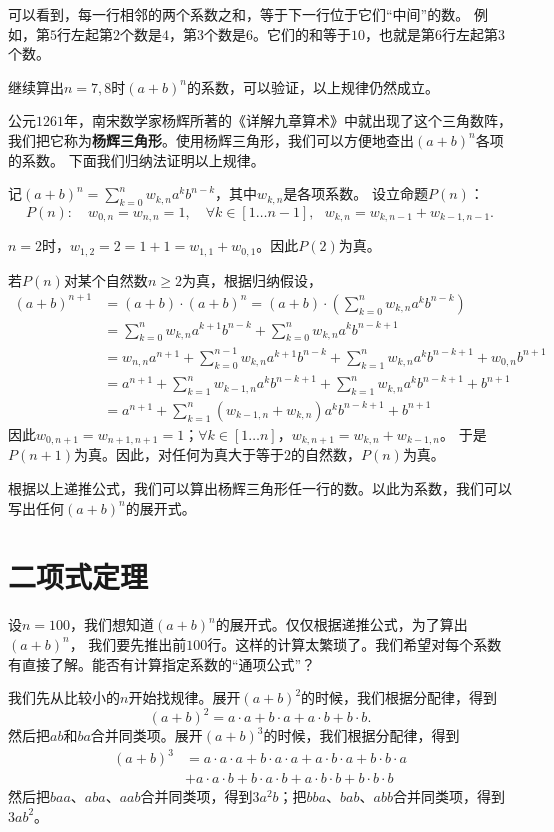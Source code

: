 \documentclass[12pt,UTF8]{ctexbook}
\begin{document}
可以看到，每一行相邻的两个系数之和，等于下一行位于它们“中间”的数。
例如，第$5$行左起第$2$个数是$4$，第$3$个数是$6$。它们的和等于$10$，也就是第$6$行左起第$3$个数。

继续算出$n=7,8$时$(a+b)^n$的系数，可以验证，以上规律仍然成立。

公元$1261$年，南宋数学家杨辉所著的《详解九章算术》中就出现了这个三角数阵，
我们把它称为\textbf{杨辉三角形}。使用杨辉三角形，我们可以方便地查出$(a+b)^n$各项的系数。
下面我们归纳法证明以上规律。

记$(a+b)^n = \sum_{k=0}^n w_{k,n} a^k b^{n-k}$，其中$w_{k,n}$是各项系数。
设立命题$P(n)$：
$$P(n): \quad w_{0,n}=w_{n,n}=1, \quad \forall k\in[1\ldots n-1], \,\,\,\, w_{k,n} = w_{k,n-1} + w_{k-1,n-1}.$$

$n=2$时，$w_{1,2} = 2 = 1 + 1 = w_{1,1} + w_{0,1}$。因此$P(2)$为真。

若$P(n)$对某个自然数$n\geqslant 2$为真，根据归纳假设，
\begin{align*}
 (a+b)^{n+1} &= (a+b)\cdot(a+b)^n = (a+b)\cdot\left(\sum_{k=0}^n w_{k,n} a^k b^{n-k}\right)  \\
  &= \sum_{k=0}^n w_{k,n} a^{k+1} b^{n-k} + \sum_{k=0}^n w_{k,n} a^k b^{n-k+1}  \\
  &= w_{n,n}a^{n+1} + \sum_{k=0}^{n-1} w_{k,n} a^{k+1} b^{n-k} + \sum_{k=1}^n w_{k,n} a^k b^{n-k+1} + w_{0,n}b^{n+1}  \\
  &= a^{n+1} + \sum_{k=1}^{n} w_{k-1,n} a^{k} b^{n-k+1} + \sum_{k=1}^n w_{k,n} a^k b^{n-k+1} + b^{n+1} \\
  &= a^{n+1} + \sum_{k=1}^{n} (w_{k-1,n} + w_{k,n}) a^{k} b^{n-k+1} + b^{n+1} 
\end{align*}
因此$w_{0,n+1}=w_{n+1,n+1}=1$；$\forall k\in[1\ldots n]$，$w_{k,n+1} = w_{k,n} + w_{k-1,n}$。
于是$P(n+1)$为真。因此，对任何为真大于等于$2$的自然数，$P(n)$为真。

根据以上递推公式，我们可以算出杨辉三角形任一行的数。以此为系数，我们可以写出任何$(a+b)^n$的展开式。

\section{二项式定理}

设$n=100$，我们想知道$(a+b)^n$的展开式。仅仅根据递推公式，为了算出$(a+b)^n$，
我们要先推出前$100$行。这样的计算太繁琐了。我们希望对每个系数有直接了解。能否有计算指定系数的“通项公式”？

我们先从比较小的$n$开始找规律。展开$(a+b)^2$的时候，我们根据分配律，得到
$$ (a+b)^2 = a\cdot a + b\cdot a + a\cdot b + b\cdot b. $$
然后把$ab$和$ba$合并同类项。展开$(a+b)^3$的时候，我们根据分配律，得到
\begin{align*}
 (a+b)^3 &= a\cdot a\cdot a + b\cdot a\cdot a + a\cdot b\cdot a + b\cdot b\cdot a \\
  &+ a\cdot a\cdot b + b\cdot a\cdot b + a\cdot b\cdot b + b\cdot b\cdot b  
\end{align*}
然后把$baa$、$aba$、$aab$合并同类项，得到$3a^2b$；把$bba$、$bab$、$abb$合并同类项，得到$3ab^2$。
\end{document}
